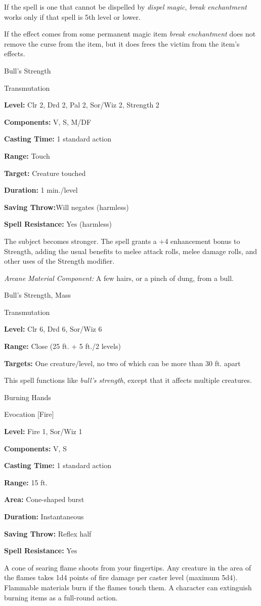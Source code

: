 \documentclass{article}
\begin{document}
If the spell is one that cannot be dispelled by \textit{dispel magic}, \textit{break 
enchantment }works only if that spell is 5th level or lower. 

If the effect comes from some permanent magic item \textit{break enchantment }does 
not remove the curse from the item, but it does frees the victim from the item's 
effects. 

\vspace{12pt}
Bull's Strength

Transmutation

\textbf{Level:} Clr 2, Drd 2, Pal 2, Sor/Wiz 2, Strength 2

\textbf{Components:} V, S, M/DF

\textbf{Casting Time:} 1 standard action

\textbf{Range:} Touch

\textbf{Target:} Creature touched

\textbf{Duration:} 1 min./level

\textbf{Saving Throw:}Will negates (harmless)

\textbf{Spell Resistance:} Yes (harmless)

The subject becomes stronger. The spell grants a +4 enhancement bonus to Strength, 
adding the usual benefits to melee attack rolls, melee damage rolls, and other 
uses of the Strength modifier.

\textit{Arcane Material Component: }A few hairs, or a pinch of dung, from a bull.

\vspace{12pt}
Bull's Strength, Mass

Transmutation

\textbf{Level:} Clr 6, Drd 6, Sor/Wiz 6

\textbf{Range:} Close (25 ft. + 5 ft./2 levels)

\textbf{Targets:} One creature/level, no two of which can be more than 30 ft. apart

This spell functions like \textit{bull's strength}, except that it affects multiple 
creatures.

\vspace{12pt}
Burning Hands

Evocation [Fire]

\textbf{Level:} Fire 1, Sor/Wiz 1

\textbf{Components:} V, S

\textbf{Casting Time:} 1 standard action

\textbf{Range:} 15 ft.

\textbf{Area:} Cone-shaped burst

\textbf{Duration:} Instantaneous

\textbf{Saving Throw:} Reflex half

\textbf{Spell Resistance:} Yes

A cone of searing flame shoots from your fingertips. Any creature in the area of 
the flames takes 1d4 points of fire damage per caster level (maximum 5d4). Flammable 
materials burn if the flames touch them. A character can extinguish burning items 
as a full-round action.

\newpage
\end{document}
